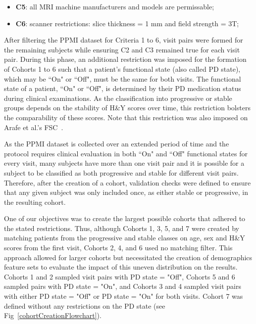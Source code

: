 \documentclass[10pt,letterpaper]{article}
\begin{document}
\begin{itemize}
  \item \textbf{C5}: all MRI machine manufacturers and models are permissable;
  \item \textbf{C6}: scanner restrictions: slice thickness = 1 mm and field strength = 3T;
\end{itemize}

After filtering the PPMI dataset for Criteria 1 to 6, visit pairs were formed for the remaining subjects while ensuring C2 and C3 remained true for each visit pair. 
During this phase, an additional restriction was imposed for the formation of Cohorts 1 to 6 such that a patient's functional state (also called PD state), which 
may be ``On" or ``Off", must be the same for both visits. The functional state of a patient, ``On" or ``Off", is determined by their PD medication status during clinical 
examinations. As the classification into progressive or stable groups depends on the stability of H\&Y scores over time, this restriction bolsters the comparability of 
these scores. Note that this restriction was also imposed on Arafe et al.'s FSC~\cite{Arafe2023.05.05.539590}.

As the PPMI dataset is collected over an extended period of time and the protocol requires clinical evaluation in both ``On" and ``Off" functional states for every visit, many 
subjects have more than one visit pair and it is possible for a subject to be classified as both progressive and stable for different visit pairs. Therefore, after the 
creation of a cohort, validation checks were defined to ensure that any given subject was only included once, as either stable or progressive, in the resulting cohort. 

One of our objectives was to create the largest possible cohorts that adhered to the stated restrictions. Thus, although Cohorts 1, 3, 5, and 7 were created 
by matching patients from the progressive and stable classes on age, sex and H\&Y scores from the first visit, Cohorts 2, 4, and 6 used no matching filter.
This approach allowed for larger cohorts but necessitated the creation of demographics feature sets to evaluate the impact of this uneven distribution on the results. 
Cohorts 1 and 2 sampled visit pairs with PD state = "Off", Cohorts 5 and 6 sampled pairs with PD state = "On", and Cohorts 3 and 4 sampled visit pairs with 
either PD state = "Off" or PD state = "On" for both visits. Cohort 7 was defined without any restrictions on the PD state (see Fig~\ref{cohortCreationFlowchart}).
\end{document}

